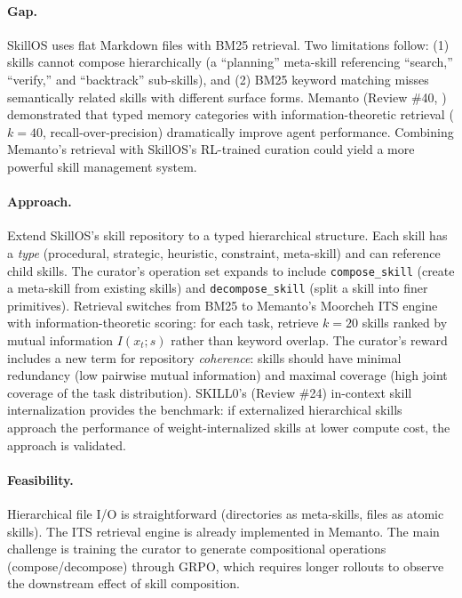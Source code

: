 \documentclass[11pt]{article}
\begin{document}
\paragraph{Gap.}
SkillOS uses flat Markdown files with BM25 retrieval. Two limitations follow: (1) skills cannot compose hierarchically (a ``planning'' meta-skill referencing ``search,'' ``verify,'' and ``backtrack'' sub-skills), and (2) BM25 keyword matching misses semantically related skills with different surface forms. Memanto (Review \#40, \cite{memanto}) demonstrated that typed memory categories with information-theoretic retrieval ($k{=}40$, recall-over-precision) dramatically improve agent performance. Combining Memanto's retrieval with SkillOS's RL-trained curation could yield a more powerful skill management system.

\paragraph{Approach.}
Extend SkillOS's skill repository to a typed hierarchical structure. Each skill has a \emph{type} (procedural, strategic, heuristic, constraint, meta-skill) and can reference child skills. The curator's operation set expands to include \texttt{compose\_skill} (create a meta-skill from existing skills) and \texttt{decompose\_skill} (split a skill into finer primitives). Retrieval switches from BM25 to Memanto's Moorcheh ITS engine with information-theoretic scoring: for each task, retrieve $k{=}20$ skills ranked by mutual information $I(x_t; s)$ rather than keyword overlap. The curator's reward includes a new term for repository \emph{coherence}: skills should have minimal redundancy (low pairwise mutual information) and maximal coverage (high joint coverage of the task distribution). SKILL0's (Review \#24) in-context skill internalization provides the benchmark: if externalized hierarchical skills approach the performance of weight-internalized skills at lower compute cost, the approach is validated.

\paragraph{Feasibility.}
Hierarchical file I/O is straightforward (directories as meta-skills, files as atomic skills). The ITS retrieval engine is already implemented in Memanto. The main challenge is training the curator to generate compositional operations (compose/decompose) through GRPO, which requires longer rollouts to observe the downstream effect of skill composition.
\end{document}
